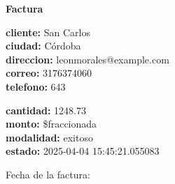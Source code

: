 \documentclass{article}
\begin{document}
\begin{center}
    {\LARGE \textbf{Factura}}\\[1cm]
\end{center}

\textbf{cliente:} San Carlos \\
\textbf{ciudad:} Córdoba \\
\textbf{direccion:} leonmorales@example.com \\
\textbf{correo:} 3176374060 \\
\textbf{telefono:} 643 \\

\vspace{0.5cm}

\textbf{cantidad:} 1248.73 \\
\textbf{monto:} \$fraccionada \\
\textbf{modalidad:} exitoso \\
\textbf{estado:} 2025-04-04 15:45:21.055083 \\

\vspace{1cm}

Fecha de la factura: 
\end{document}
